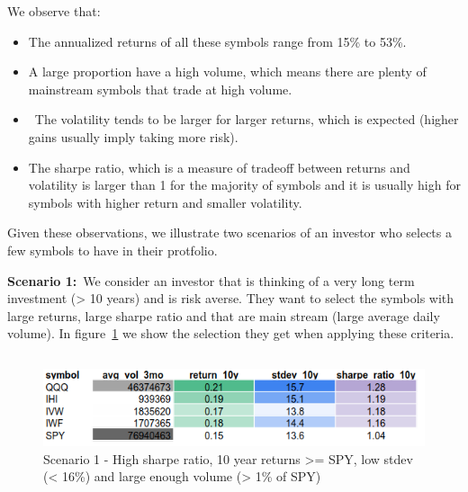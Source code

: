 \documentclass[10pt]{article}
\providecommand{\tightlist}{\setlength{\itemsep}{0pt}\setlength{\parskip}{0pt}}%
\begin{document}
We observe that:

\begin{itemize}
\tightlist
\item
  The annualized returns of all these symbols range from 15\% to 53\%.
\item
  A large proportion have a high volume, which means there are plenty of
  mainstream symbols that trade at high volume.
\item
  ~The volatility tends to be larger for larger returns, which is
  expected (higher gains usually imply taking more risk).
\item
  The sharpe ratio, which is a measure of tradeoff between returns and
  volatility is larger than 1 for the majority of symbols and it is
  usually high for symbols with higher return and smaller volatility.~
\end{itemize}

Given these observations, we illustrate two scenarios of an investor who
selects a few symbols to have in their protfolio.

\textbf{Scenario 1:}~We consider an investor that is thinking of a very
long term investment (\textgreater{} 10 years) and is risk averse. They
want to select the symbols with large returns, large sharpe ratio and
that are main stream (large average daily volume). In
figure~{\ref{892879}} we show the selection they get
when applying these criteria.~

\hypertarget{section}{%
\subsection{}\label{section}}
\begin{figure}[H]
\begin{center}
\includegraphics[width=0.70\columnwidth]{figures/screenshot1/screenshot1}
\caption{{Scenario 1 - High sharpe ratio, 10 year returns \textgreater= SPY, low
stdev (\textless{} 16\%) and large enough volume (\textgreater{} 1\% of
SPY)
{\label{892879}}%
}}
\end{center}
\end{figure}
\end{document}
